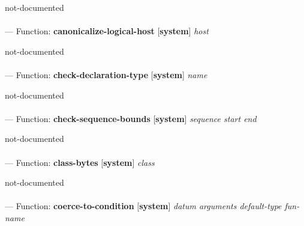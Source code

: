 \begin{adjustwidth}{5em}{5em}
not-documented
\end{adjustwidth}

\paragraph{}
\label{SYSTEM:CANONICALIZE-LOGICAL-HOST}
--- Function: \textbf{canonicalize-logical-host} [\textbf{system}] \textit{host}

\begin{adjustwidth}{5em}{5em}
not-documented
\end{adjustwidth}

\paragraph{}
\label{SYSTEM:CHECK-DECLARATION-TYPE}
--- Function: \textbf{check-declaration-type} [\textbf{system}] \textit{name}

\begin{adjustwidth}{5em}{5em}
not-documented
\end{adjustwidth}

\paragraph{}
\label{SYSTEM:CHECK-SEQUENCE-BOUNDS}
--- Function: \textbf{check-sequence-bounds} [\textbf{system}] \textit{sequence start end}

\begin{adjustwidth}{5em}{5em}
not-documented
\end{adjustwidth}

\paragraph{}
\label{SYSTEM:CLASS-BYTES}
--- Function: \textbf{class-bytes} [\textbf{system}] \textit{class}

\begin{adjustwidth}{5em}{5em}
not-documented
\end{adjustwidth}

\paragraph{}
\label{SYSTEM:COERCE-TO-CONDITION}
--- Function: \textbf{coerce-to-condition} [\textbf{system}] \textit{datum arguments default-type fun-name}

